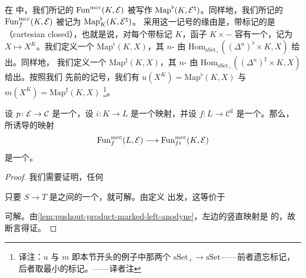 \begin{remark}\label{rem:map-notation}
在 \cite{Lur09} 中，我们所记的 $\mathrm{Fun}^{\mathrm{mcc}}(K, \mathcal{E})$ 被写作
$\mathrm{Map}^\flat(K, \mathcal{E}^\natural)$。同样地，我们所记的
$\mathrm{Fun}^{\mathrm{mcc}}_f(K, \mathcal{E})$ 被记为
$\mathrm{Map}^\flat_K(K, \mathcal{E}^\natural)$。
采用这一记号的缘由是，带标记\trSimplicialSet{}的\trCategory{}是\emph{\trCartesianClosed}
（cartesian closed），也就是说，对每个带标记\trSimplicialSet{} $K$，函子
$K \times -$ 容有一个\trRightAdjoint{}，记为 $X \mapsto X^K$。我们定义一个%
\trSimplicialSet{} $\mathrm{Map}^\flat(K, X)$，其 $n$-\trSimplex{} 由
$\mathrm{Hom}_{\mathrm{sSet}_+}((\Delta^n)^\flat \times K, X)$ 给出。同样地，
我们定义一个\trSimplicialSet{} $\mathrm{Map}^\sharp(K, X)$，其 $n$-\trSimplex{}%
由 $\mathrm{Hom}_{\mathrm{sSet}_+}((\Delta^n)^\sharp \times K, X)$ 给出。按照我们
先前的记号，我们有 $u(X^K) = \mathrm{Map}^\flat(K, X)$ 与
$m(X^K) = \mathrm{Map}^\sharp(K, X)$%
\footnote{译注：$u$ 与 $m$ 即本节开头的例子中那两个\trFunctor{} $\mathrm{sSet}_+ \to \mathrm{sSet}$——前者遗忘标记，后者取最小的标记。——译者注}。
\end{remark}

\begin{proposition}\label{prop:fun-mcc-trivial-fibration}
设 $p\colon \mathcal{E} \to \mathcal{C}$ 是一个\trCocartesianFibration{}，设
$i\colon K \to L$ 是一个\trMarkedAnodyne{}映射，并设 $f\colon L \to \mathcal{C}^\sharp$
是一个\trMorphism{}。那么，所诱导的映射
\[
\mathrm{Fun}^{\mathrm{mcc}}_f(L, \mathcal{E})
\longrightarrow
\mathrm{Fun}^{\mathrm{mcc}}_{fi}(K, \mathcal{E})
\]
是一个\trTrivialFibration{}。
\end{proposition}

\begin{proof}
我们需要证明，任何\trLiftingProblem{}%
\begin{center}
\end{center}
只要 $S \to T$ 是\trSimplicialSet{}之间的一个\trMonomorphism{}，就可解。由定义
出发，这等价于\trLiftingProblem{}%
\begin{center}
\end{center}
可解。由\cref{lem:pushout-product-marked-left-anodyne}，左边的竖直映射是%
\trMarkedAnodyne{}的，故断言得证。
\end{proof}

